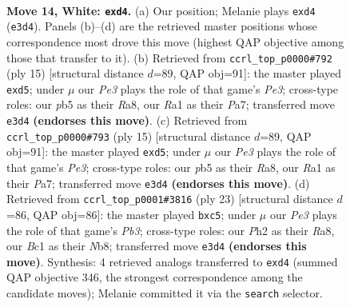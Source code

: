 \documentclass[11pt]{article}
\begin{document}
\clearpage

\begin{figure}[p]\centering
\begin{subfigure}{0.46\textwidth}\centering
\resizebox{\linewidth}{!}{%
\newchessgame
\chessboard[
  setfen={rn1q1rk1/4bp2/5np1/ppp4p/3p4/1P1PPNP1/P4PKP/RNBQ1R2 w - - 0 14},
  showmover=false,
  pgfstyle=straightmove, color=movearrow, markmove={e3-d4}
]}
\caption{}
\end{subfigure}\hfill
\begin{subfigure}{0.46\textwidth}\centering
\resizebox{\linewidth}{!}{%
\newchessgame
\chessboard[
  setfen={rnbq1rk1/pp3pbp/3ppnp1/2pP4/2P1P3/3B1N1P/PP3PP1/RNBQ1RK1 b - - 0 8},
  showmover=false,
  pgfstyle=straightmove, color=movearrow, markmove={e6-d5}
]}
\caption{}
\end{subfigure}
\\[4pt]
\begin{subfigure}{0.46\textwidth}\centering
\resizebox{\linewidth}{!}{%
\newchessgame
\chessboard[
  setfen={rnbq1rk1/pp3pbp/3ppnp1/2pP4/2P1P3/3B1N1P/PP3PP1/RNBQ1RK1 b - - 0 8},
  showmover=false,
  pgfstyle=straightmove, color=movearrow, markmove={e6-d5}
]}
\caption{}
\end{subfigure}\hfill
\begin{subfigure}{0.46\textwidth}\centering
\resizebox{\linewidth}{!}{%
\newchessgame
\chessboard[
  setfen={rn3rk1/pbp1qppp/1p1pp3/2P5/3P4/2Q2NP1/PP2PPBP/R4RK1 b - - 0 12},
  showmover=false,
  pgfstyle=straightmove, color=movearrow, markmove={b6-c5}
]}
\caption{}
\end{subfigure}
\caption{\textbf{Move 14, White: \texttt{exd4}.} (a) Our position; Melanie plays \texttt{exd4} (\texttt{e3d4}). Panels (b)--(d) are the retrieved master positions whose correspondence most drove this move (highest QAP objective among those that transfer to it). (b) Retrieved from \texttt{ccrl\_top\_p0000\#792} (ply 15) [structural distance $d$=89, QAP obj=91]: the master played \texttt{exd5}; under $\mu$ our \emph{Pe3} plays the role of that game's \emph{Pe3}; cross-type roles: our \emph{p}b5 as their \emph{R}a8, our \emph{R}a1 as their \emph{P}a7; transferred move \texttt{e3d4} \textbf{(endorses this move)}. (c) Retrieved from \texttt{ccrl\_top\_p0000\#793} (ply 15) [structural distance $d$=89, QAP obj=91]: the master played \texttt{exd5}; under $\mu$ our \emph{Pe3} plays the role of that game's \emph{Pe3}; cross-type roles: our \emph{p}b5 as their \emph{R}a8, our \emph{R}a1 as their \emph{P}a7; transferred move \texttt{e3d4} \textbf{(endorses this move)}. (d) Retrieved from \texttt{ccrl\_top\_p0001\#3816} (ply 23) [structural distance $d$=86, QAP obj=86]: the master played \texttt{bxc5}; under $\mu$ our \emph{Pe3} plays the role of that game's \emph{Pb3}; cross-type roles: our \emph{P}h2 as their \emph{R}a8, our \emph{B}c1 as their \emph{N}b8; transferred move \texttt{e3d4} \textbf{(endorses this move)}. Synthesis: 4 retrieved analogs transferred to \texttt{exd4} (summed QAP objective 346, the strongest correspondence among the candidate moves); Melanie committed it via the \texttt{search} selector.}
\label{fig:thought-m26}
\end{figure}
\end{document}
